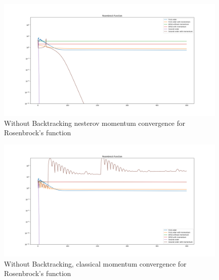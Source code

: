 \documentclass{article}
\begin{document}
\begin{figure}[H]
	\includegraphics[width=\linewidth]{../Images/rosenbrocknesterov1.png}
	\caption{Without Backtracking nesterov momentum convergence for Rosenbrock's function}
	\label{fig:Without Backtracking nesterov momentum convergence for Rosenbrock's function}
\end{figure}

\begin{figure}[H]
	\includegraphics[width=\linewidth]{../Images/rosenbrockmomentum1.png}
	\caption{Without Backtracking, classical momentum convergence for Rosenbrock's function}
	\label{fig:Without Backtracking, classical momentum convergence for Rosenbrock's function}
\end{figure}
\end{document}
